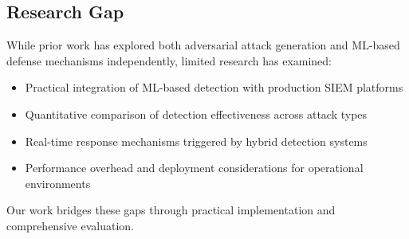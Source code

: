 \subsection{Research Gap}

While prior work has explored both adversarial attack generation and ML-based defense mechanisms independently, limited research has examined:

\begin{itemize}
    \item Practical integration of ML-based detection with production SIEM platforms
    \item Quantitative comparison of detection effectiveness across attack types
    \item Real-time response mechanisms triggered by hybrid detection systems
    \item Performance overhead and deployment considerations for operational environments
\end{itemize}

Our work bridges these gaps through practical implementation and comprehensive evaluation.